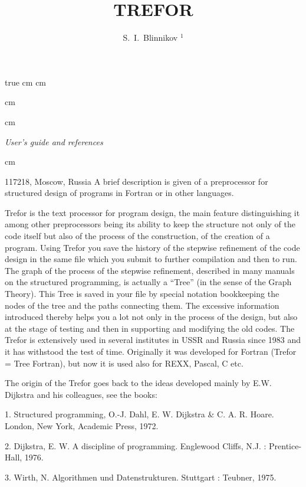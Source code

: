 \def\giveeqname{0}
 true cm
 cm

 cm
\title{TREFOR}
 cm
\centerline{\sl User's guide and references}
 cm
\author{S.~I.~Blinnikov $^{1}$}
%
 {117218, Moscow, Russia}
\summary
A brief description is given of a preprocessor for structured
design of programs in Fortran or in other languages.
\endpage
{}


    Trefor is the text processor for program design, the main feature
distinguishing it among other preprocessors being its ability to keep
the structure not only of the code itself but also of the process of
the construction, of the creation of a program. Using Trefor you
save the history of the stepwise refinement of the code design in the
same file which you submit to further compilation and then to run.
The graph of the process of the stepwise refinement, described in
many manuals on the structured programming, is actually a ``Tree''
(in the sense of the Graph Theory). This Tree is saved in your file
by special notation bookkeeping the nodes of the tree and the paths
connecting them. The excessive information introduced thereby helps
you a lot not only in the process of the design, but also at the stage
of testing and then in supporting and modifying the old codes. The
Trefor is extensively used in several institutes in USSR and Russia
since 1983
and it has withstood the test of time. Originally it was developed
for Fortran (Trefor = Tree Fortran), but now it is used also for
REXX, Pascal, C etc.

The origin of the Trefor goes back to the ideas developed mainly
by E.W. Dijkstra and his colleagues, see the books:

\item{1.} Structured programming,  O.-J. Dahl, E. W. Dijkstra \& C. A. R.
   Hoare.  London, New York, Academic Press, 1972.

\item{2.} Dijkstra, E. W.
     A discipline of programming.  Englewood Cliffs, N.J.
   : Prentice-Hall, 1976.

\item{3.} Wirth, N.
      Algorithmen und Datenstrukturen.  Stuttgart : Teubner, 1975.

